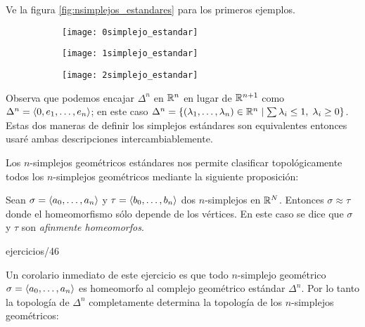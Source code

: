 \documentclass[../../topologia_algebraica]{subfiles}
\begin{document}
Ve la figura \ref{fig:nsimplejos_estandares} para los primeros ejemplos.

\begin{figure}[h!] %
  \centering
  \caption{Ejemplos de $n$-simplejos geom\'etricos est\'andares de dimensi\'on 0,1 y 2}
  \label{fig:nsimplejos_estandares}
  \begin{subfigure}{0.3\textwidth}
    \texttt{[image: 0simplejo\_estandar]}    
  \end{subfigure}
  \begin{subfigure}{0.3\textwidth}
    \texttt{[image: 1simplejo\_estandar]}    
  \end{subfigure}
  \begin{subfigure}{0.3\textwidth}
    \texttt{[image: 2simplejo\_estandar]}    
  \end{subfigure}
\end{figure}%

Observa que podemos encajar $\Delta^n$ en $\mathbb{R}^n$ en lugar de $\mathbb{R}^{n+1}$ como
$\Delta^n=\langle 0,e_1,\ldots,e_n \rangle$; en este caso
$\Delta^n=\{(\lambda_1,\ldots,\lambda_n)\in\mathbb{R}^n\mid \sum\lambda_i\leq 1,\;\lambda_i\geq 0\}$. Estas dos maneras de
definir los simplejos est\'andares son equivalentes entonces usar\'e ambas descripciones
intercambiablemente.

Los $n$-simplejos geom\'etricos est\'andares nos permite clasificar topol\'ogicamente todos los
$n$-simplejos geom\'etricos mediante la siguiente proposici\'on:

\begin{prop}\label{prop:clasificacion_simplejos_geometricos}
  Sean $\sigma=\langle a_0,\ldots,a_n \rangle$ y $\tau=\langle b_0,\ldots,b_n \rangle$ dos $n$-simplejos en $\mathbb{R}^N$.
  Entonces $\sigma\approx\tau$ donde el homeomorfismo s\'olo depende de los v\'ertices. En este
  caso se dice que $\sigma$ y $\tau$ son \emph{afinmente homeomorfos}.
\end{prop}

{ejercicios/46} %

Un corolario inmediato de este ejercicio es que todo $n$-simplejo geom\'etrico
$\sigma=\langle a_0,\ldots,a_n \rangle$ es homeomorfo al complejo geom\'etrico est\'andar $\Delta^n$. Por lo
tanto la topolog\'ia de $\Delta^n$ completamente determina la topolog\'ia de los $n$-simplejos
geom\'etricos:
\end{document}
